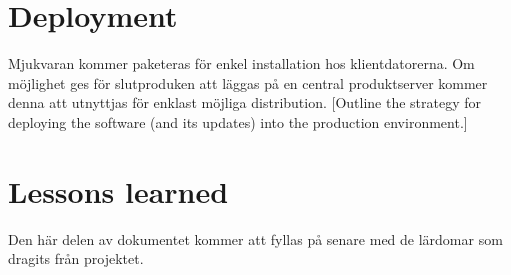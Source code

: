 \section{Deployment}
Mjukvaran kommer paketeras för enkel installation hos klientdatorerna. Om möjlighet ges för slutproduken att läggas på en central produktserver kommer denna att utnyttjas för enklast möjliga distribution.
[Outline the strategy for deploying the software (and its updates) into the production environment.]

\section{Lessons learned}
Den här delen av dokumentet kommer att fyllas på senare med de lärdomar som dragits från projektet.



